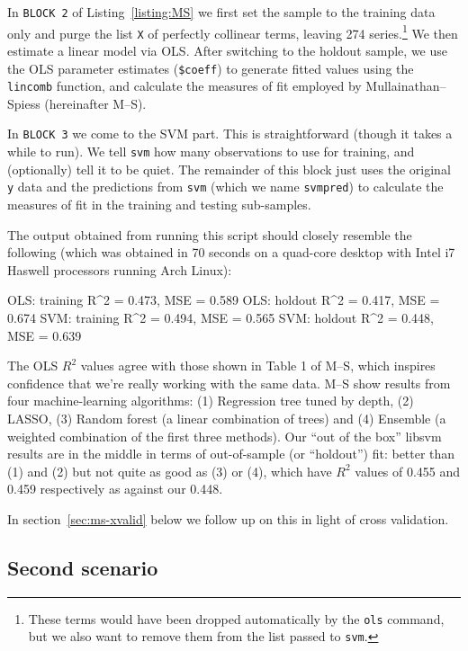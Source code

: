 \documentclass{article}
\begin{document}
In \texttt{BLOCK 2} of Listing~\ref{listing:MS} we first set the
sample to the training data only and purge the list \texttt{X} of
perfectly collinear terms, leaving 274 series.\footnote{These terms
  would have been dropped automatically by the \texttt{ols} command,
  but we also want to remove them from the list passed to
  \texttt{svm}.}  We then estimate a linear model via OLS. After
switching to the holdout sample, we use the OLS parameter
estimates (\texttt{\$coeff}) to generate fitted values using the
\texttt{lincomb} function, and calculate the measures of fit employed
by Mullainathan--Spiess (hereinafter M--S).

In \texttt{BLOCK 3} we come to the SVM part. This is straightforward
(though it takes a while to run). We tell \texttt{svm} how many
observations to use for training, and (optionally) tell it to be
quiet. The remainder of this block just uses the original \texttt{y}
data and the predictions from \texttt{svm} (which we name
\texttt{svmpred}) to calculate the measures of fit in the training and
testing sub-samples.

The output obtained from running this script should closely resemble
the following (which was obtained in 70 seconds on a quad-core desktop
with Intel i7 Haswell processors running Arch Linux):
\begin{code}
OLS: training R^2 = 0.473, MSE = 0.589
OLS: holdout  R^2 = 0.417, MSE = 0.674
SVM: training R^2 = 0.494, MSE = 0.565
SVM: holdout  R^2 = 0.448, MSE = 0.639
\end{code}
The OLS $R^2$ values agree with those shown in Table 1 of M--S, which
inspires confidence that we're really working with the same data. M--S
show results from four machine-learning algorithms: (1) Regression
tree tuned by depth, (2) LASSO, (3) Random forest (a linear
combination of trees) and (4) Ensemble (a weighted combination of the
first three methods). Our ``out of the box'' \textsf{libsvm} results
are in the middle in terms of out-of-sample (or ``holdout'') fit:
better than (1) and (2) but not quite as good as (3) or (4), which
have $R^2$ values of 0.455 and 0.459 respectively as against our
0.448.

In section~\ref{sec:ms-xvalid} below we follow up on this in light of
cross validation.

\subsection{Second scenario}
\label{sec:s2}
\end{document}
